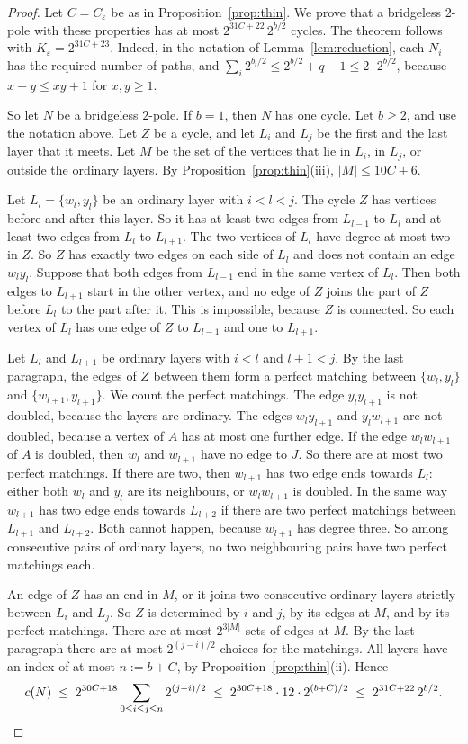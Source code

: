 \begin{proof}
Let $C=C_\varepsilon$ be as in Proposition~\ref{prop:thin}. We prove that a bridgeless $2$-pole
with these properties has at most $2^{31C+22}\,2^{b/2}$ cycles. The theorem follows with
$K_\varepsilon=2^{31C+23}$. Indeed, in the notation of Lemma~\ref{lem:reduction}, each $N_i$ has the
required number of paths, and $\sum_i2^{b_i/2}\le2^{b/2}+q-1\le2\cdot2^{b/2}$, because
$x+y\le xy+1$ for $x,y\ge1$.

So let $N$ be a bridgeless $2$-pole. If $b=1$, then $N$ has one cycle. Let $b\ge2$, and use the
notation above. Let $Z$ be a cycle, and let $L_i$ and $L_j$ be the first and the last layer that it
meets. Let $M$ be the set of the vertices that lie in $L_i$, in $L_j$, or outside the ordinary
layers. By Proposition~\ref{prop:thin}(iii), $|M|\le10C+6$.

 Let $L_l=\{w_l,y_l\}$ be an ordinary layer with $i<l<j$. The cycle $Z$ has
vertices before and after this layer. So it has at least two edges from $L_{l-1}$ to $L_l$ and at
least two edges from $L_l$ to $L_{l+1}$. The two vertices of $L_l$ have degree at most two in $Z$.
So $Z$ has exactly two edges on each side of $L_l$ and does not contain an edge $w_ly_l$. Suppose
that both edges from $L_{l-1}$ end in the same vertex of $L_l$. Then both edges to $L_{l+1}$ start
in the other vertex, and no edge of $Z$ joins the part of $Z$ before $L_l$ to the part after it.
This is impossible, because $Z$ is connected. So each vertex of $L_l$ has one edge of $Z$ to
$L_{l-1}$ and one to $L_{l+1}$.

 Let $L_l$ and $L_{l+1}$ be ordinary layers with $i<l$ and $l+1<j$. By the last
paragraph, the edges of $Z$ between them form a perfect matching between $\{w_l,y_l\}$ and
$\{w_{l+1},y_{l+1}\}$. We count the perfect matchings. The edge $y_ly_{l+1}$ is not doubled,
because the layers are ordinary. The edges $w_ly_{l+1}$ and $y_lw_{l+1}$ are not doubled, because
a vertex of $A$ has at most one further edge. If the edge $w_lw_{l+1}$ of $A$ is doubled, then
$w_l$ and $w_{l+1}$ have no edge to $J$. So there are at most two perfect matchings. If there
are two, then $w_{l+1}$ has two edge ends towards $L_l$: either both $w_l$ and $y_l$ are its
neighbours, or $w_lw_{l+1}$ is doubled. In the same way $w_{l+1}$ has two edge ends towards
$L_{l+2}$ if there are two perfect matchings between $L_{l+1}$ and $L_{l+2}$. Both cannot happen,
because $w_{l+1}$ has degree three. So among consecutive pairs of ordinary layers, no two
neighbouring pairs have two perfect matchings each.

 An edge of $Z$ has an end in $M$, or it joins two consecutive ordinary layers
strictly between $L_i$ and $L_j$. So $Z$ is determined by $i$ and $j$, by its edges at $M$, and by
its perfect matchings. There are at most $2^{3|M|}$ sets of edges at $M$. By the last paragraph
there are at most $2^{(j-i)/2}$ choices for the matchings. All layers have an index of at most
$n:=b+C$, by Proposition~\ref{prop:thin}(ii). Hence
\[
  c(N)\;\le\;2^{30C+18}\sum_{0\le i\le j\le n}2^{(j-i)/2}
  \;\le\;2^{30C+18}\cdot12\cdot2^{(b+C)/2}\;\le\;2^{31C+22}\,2^{b/2}.\qedhere
\]
\end{proof}

